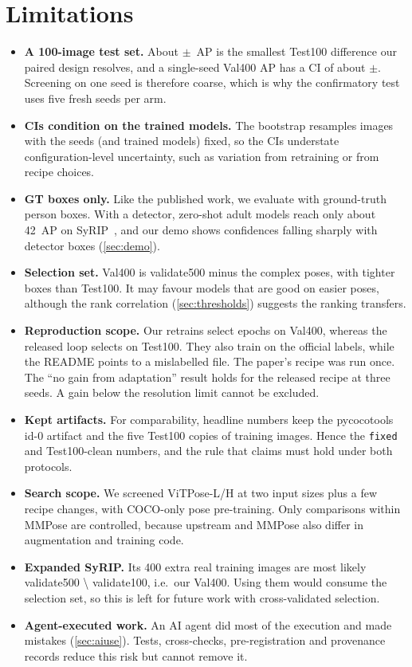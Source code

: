 \section{Limitations}\label{sec:limits}

\begin{itemize}[leftmargin=*]
  \item \textbf{A 100-image test set.} About $\pm$~AP is the smallest Test100 difference our paired design resolves, and a single-seed Val400 AP has a CI of about $\pm$.
  Screening on one seed is therefore coarse, which is why the confirmatory test uses five fresh seeds per arm.
  \item \textbf{CIs condition on the trained models.} The bootstrap resamples images with the seeds (and trained models) fixed, so the CIs understate configuration-level uncertainty, such as variation from retraining or from recipe choices.
  \item \textbf{GT boxes only.} Like the published work, we evaluate with ground-truth person boxes. With a detector, zero-shot adult models reach only about 42~AP on SyRIP~\citep{gama2025seven}, and our demo shows confidences falling sharply with detector boxes (\cref{sec:demo}).
  \item \textbf{Selection set.} Val400 is validate500 minus the complex poses, with tighter boxes than Test100. It may favour models that are good on easier poses, although the rank correlation (\cref{sec:thresholds}) suggests the ranking transfers.
  \item \textbf{Reproduction scope.} Our retrains select epochs on Val400, whereas the released loop selects on Test100. They also train on the official labels, while the README points to a mislabelled file. The paper's recipe was run once.
  The ``no gain from adaptation'' result holds for the released recipe at three seeds. A gain below the resolution limit cannot be excluded.
  \item \textbf{Kept artifacts.} For comparability, headline numbers keep the pycocotools id-0 artifact and the five Test100 copies of training images. Hence the \texttt{fixed} and Test100-clean numbers, and the rule that claims must hold under both protocols.
  \item \textbf{Search scope.} We screened ViTPose-L/H at two input sizes plus a few recipe changes, with COCO-only pose pre-training. Only comparisons within MMPose are controlled, because upstream and MMPose also differ in augmentation and training code.
  \item \textbf{Expanded SyRIP.} Its 400 extra real training images are most likely validate500 \textbackslash{} validate100, i.e.\ our Val400. Using them would consume the selection set, so this is left for future work with cross-validated selection.
  \item \textbf{Agent-executed work.} An AI agent did most of the execution and made mistakes (\cref{sec:aiuse}). Tests, cross-checks, pre-registration and provenance records reduce this risk but cannot remove it.
\end{itemize}
